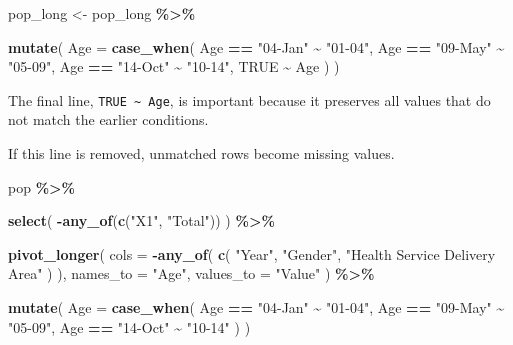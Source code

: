 \documentclass[
  11pt,
  oneside]{book}
\newenvironment{Shaded}{\begin{snugshade}}{\end{snugshade}}
\newcommand{\AttributeTok}[1]{\textcolor[rgb]{0.13,0.29,0.53}{#1}}
\newcommand{\ConstantTok}[1]{\textcolor[rgb]{0.56,0.35,0.01}{#1}}
\newcommand{\FunctionTok}[1]{\textcolor[rgb]{0.13,0.29,0.53}{\textbf{#1}}}
\newcommand{\NormalTok}[1]{#1}
\newcommand{\OtherTok}[1]{\textcolor[rgb]{0.56,0.35,0.01}{#1}}
\newcommand{\SpecialCharTok}[1]{\textcolor[rgb]{0.81,0.36,0.00}{\textbf{#1}}}
\newcommand{\StringTok}[1]{\textcolor[rgb]{0.31,0.60,0.02}{#1}}
\begin{document}
\begin{Shaded}
\begin{Highlighting}[]
\NormalTok{pop\_long }\OtherTok{\textless{}{-}}\NormalTok{ pop\_long }\SpecialCharTok{\%\textgreater{}\%}
  
  \FunctionTok{mutate}\NormalTok{(}
    \AttributeTok{Age =} \FunctionTok{case\_when}\NormalTok{(}
\NormalTok{      Age }\SpecialCharTok{==} \StringTok{"04{-}Jan"} \SpecialCharTok{\textasciitilde{}} \StringTok{"01{-}04"}\NormalTok{,}
\NormalTok{      Age }\SpecialCharTok{==} \StringTok{"09{-}May"} \SpecialCharTok{\textasciitilde{}} \StringTok{"05{-}09"}\NormalTok{,}
\NormalTok{      Age }\SpecialCharTok{==} \StringTok{"14{-}Oct"} \SpecialCharTok{\textasciitilde{}} \StringTok{"10{-}14"}\NormalTok{,}
      \ConstantTok{TRUE} \SpecialCharTok{\textasciitilde{}}\NormalTok{ Age}
\NormalTok{    )}
\NormalTok{  )}
\end{Highlighting}
\end{Shaded}

The final line, \texttt{TRUE\ \textasciitilde{}\ Age}, is important because it preserves all values that do not match the earlier conditions.

If this line is removed, unmatched rows become missing values.

\begin{Shaded}
\begin{Highlighting}[]
\NormalTok{pop }\SpecialCharTok{\%\textgreater{}\%}
  
  \FunctionTok{select}\NormalTok{(}
    \SpecialCharTok{{-}}\FunctionTok{any\_of}\NormalTok{(}\FunctionTok{c}\NormalTok{(}\StringTok{"X1"}\NormalTok{, }\StringTok{"Total"}\NormalTok{))}
\NormalTok{  ) }\SpecialCharTok{\%\textgreater{}\%}
  
  \FunctionTok{pivot\_longer}\NormalTok{(}
    \AttributeTok{cols =} \SpecialCharTok{{-}}\FunctionTok{any\_of}\NormalTok{(}
      \FunctionTok{c}\NormalTok{(}
        \StringTok{"Year"}\NormalTok{,}
        \StringTok{"Gender"}\NormalTok{,}
        \StringTok{"Health Service Delivery Area"}
\NormalTok{      )}
\NormalTok{    ),}
    \AttributeTok{names\_to =} \StringTok{"Age"}\NormalTok{,}
    \AttributeTok{values\_to =} \StringTok{"Value"}
\NormalTok{  ) }\SpecialCharTok{\%\textgreater{}\%}
  
  \FunctionTok{mutate}\NormalTok{(}
    \AttributeTok{Age =} \FunctionTok{case\_when}\NormalTok{(}
\NormalTok{      Age }\SpecialCharTok{==} \StringTok{"04{-}Jan"} \SpecialCharTok{\textasciitilde{}} \StringTok{"01{-}04"}\NormalTok{,}
\NormalTok{      Age }\SpecialCharTok{==} \StringTok{"09{-}May"} \SpecialCharTok{\textasciitilde{}} \StringTok{"05{-}09"}\NormalTok{,}
\NormalTok{      Age }\SpecialCharTok{==} \StringTok{"14{-}Oct"} \SpecialCharTok{\textasciitilde{}} \StringTok{"10{-}14"}
\NormalTok{    )}
\NormalTok{  )}
\end{Highlighting}
\end{Shaded}
\end{document}
